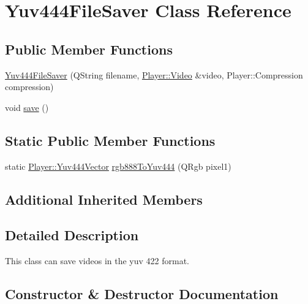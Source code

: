 \hypertarget{classPlayer_1_1Yuv444FileSaver}{}\section{Yuv444\+File\+Saver Class Reference}
\label{classPlayer_1_1Yuv444FileSaver}
\subsection*{Public Member Functions}
\begin{DoxyCompactItemize}
\item 
\hyperlink{classPlayer_1_1Yuv444FileSaver_a12ca266e2d9bbc7639bbe132b9cec599}{Yuv444\+File\+Saver} (Q\+String filename, \hyperlink{classPlayer_1_1Video}{Player\+::\+Video} \&video, Player\+::\+Compression compression)
\item 
void \hyperlink{classPlayer_1_1Yuv444FileSaver_aae2c382151ef7c9aa913361172b30db6}{save} ()
\end{DoxyCompactItemize}
\subsection*{Static Public Member Functions}
\begin{DoxyCompactItemize}
\item 
static \hyperlink{classPlayer_1_1Yuv444Vector}{Player\+::\+Yuv444\+Vector} \hyperlink{classPlayer_1_1Yuv444FileSaver_ad2dcb5e8dc805bfeb49681d554ac2f6b}{rgb888\+To\+Yuv444} (Q\+Rgb pixel1)
\end{DoxyCompactItemize}
\subsection*{Additional Inherited Members}


\subsection{Detailed Description}
This class can save videos in the yuv 422 format. 

\subsection{Constructor \& Destructor Documentation}
\hypertarget{classPlayer_1_1Yuv444FileSaver_a12ca266e2d9bbc7639bbe132b9cec599}{}
